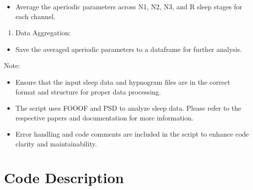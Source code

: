 \documentclass[letterpaper,10pt,english]{sphinxmanual}
\begin{document}
\begin{itemize}
\item {} 
\sphinxAtStartPar
Average the aperiodic parameters across N1, N2, N3, and R sleep stages for each channel.

\end{itemize}
\begin{enumerate}
%
\setcounter{enumi}{5}
\item {} 
\sphinxAtStartPar
Data Aggregation:

\end{enumerate}
\begin{itemize}
\item {} 
\sphinxAtStartPar
Save the averaged aperiodic parameters to a dataframe for further analysis.

\end{itemize}

\sphinxAtStartPar
Note:
\begin{itemize}
\item {} 
\sphinxAtStartPar
Ensure that the input sleep data and hypnogram files are in the correct format and structure for proper data processing.

\item {} 
\sphinxAtStartPar
The script uses FOOOF and PSD to analyze sleep data. Please refer to the respective papers and documentation for more information.

\item {} 
\sphinxAtStartPar
Error handling and code comments are included in the script to enhance code clarity and maintainability.

\end{itemize}


\section{Code Description}
\label{\detokenize{code:code-description}}
\end{document}
